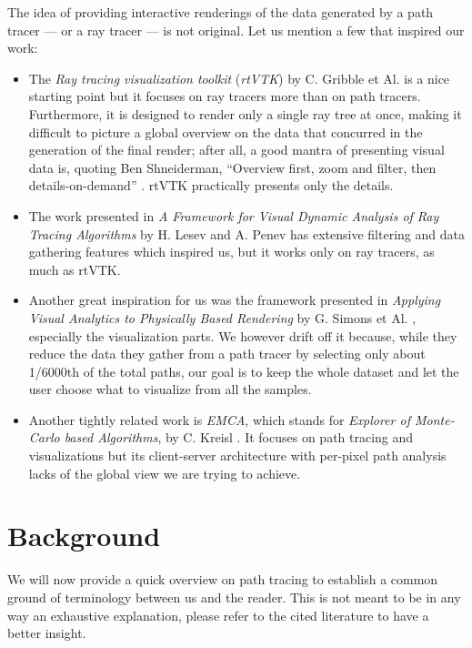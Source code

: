 The idea of providing interactive renderings of the data generated by a path tracer --- or a ray tracer --- is not original. Let us mention a few that inspired our work:
\begin{itemize}
	\item The \textit{Ray tracing visualization toolkit} (\textit{rtVTK}) by C. Gribble et Al. \cite{gribble2012ray} is a nice starting point but it focuses on ray tracers \cite{whitted1979improved, cook1984distributed} more than on path tracers.
	Furthermore, it is designed to render only a single ray tree at once, making it difficult to picture a global overview on the data that concurred in the generation of the final render; after all, a good mantra of presenting visual data is, quoting Ben Shneiderman, “Overview first, zoom and filter, then details-on-demand” \cite{shneiderman2003eyes}. rtVTK practically presents only the details.
	\item The work presented in \textit{A Framework for Visual Dynamic Analysis of Ray Tracing Algorithms} by H. Lesev and A. Penev \cite{lesev2014framework} has extensive filtering and data gathering features which inspired us, but it works only on ray tracers, as much as rtVTK.
	\item Another great inspiration for us was the framework presented in \textit{Applying Visual Analytics to Physically Based Rendering} by G. Simons et Al. \cite{simons2019applying}, especially the visualization parts. We however drift off it because, while they reduce the data they gather from a path tracer by selecting only about 1/6000th of the total paths, our goal is to keep the whole dataset and let the user choose what to visualize from all the samples.
	\item Another tightly related work is \textit{EMCA}, which stands for \textit{Explorer of Monte-Carlo based Algorithms}, by C. Kreisl \cite{EMCA@2019}. It focuses on path tracing and visualizations but its client-server architecture with per-pixel path analysis lacks of the global view we are trying to achieve.
\end{itemize}  

\section{Background}
\label{background}


We will now provide a quick overview on path tracing to establish a common ground of terminology between us and the reader. This is not meant to be in any way an exhaustive explanation, please refer to the cited literature to have a better insight.

